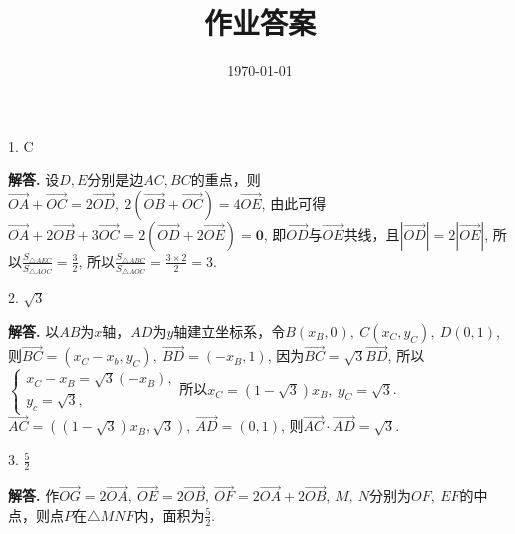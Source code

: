 \documentclass[12pt,a4paper,oneside]{ctexart}
\title{\textbf{作业答案}}
\date{\today}
\newcounter{problemname}
\newenvironment{problem}{\stepcounter{problemname}\par\noindent\textbf{题目\arabic{problemname}. }}{\\\par}
\newenvironment{solution}{\par\noindent\textbf{解答. }}{\\\par}
\newenvironment{note}{\par\noindent\textbf{题目\arabic{problemname}的注记. }}{\\\par}
\begin{document}
\maketitle



1. C
\begin{solution}
    设$ D,E $分别是边$ AC,BC $的重点，则$ \overrightarrow{OA}+\overrightarrow{OC}=2\overrightarrow{OD},\ 2(\overrightarrow{OB}+\overrightarrow{OC})=4\overrightarrow{OE} $, 由此可得$ \overrightarrow{OA}+2\overrightarrow{OB}+3\overrightarrow{OC}=2(\overrightarrow{OD}+2\overrightarrow{OE})=\boldsymbol{0} $, 即$ \overrightarrow{OD} $与$ \overrightarrow{OE} $共线，且$ |\overrightarrow{OD}|=2|\overrightarrow{OE}| $, 所以$ \frac{S_{\triangle AEC}}{S_{\triangle AOC}}=\frac{3}{2} $, 所以$ \frac{S_{\triangle ABC}}{S_{\triangle AOC}}=\frac{3\times 2}{2}=3 $.
\end{solution}

2. $ \sqrt{3} $
\begin{solution}
    以$ AB $为$ x $轴，$ AD $为$ y $轴建立坐标系，令$ B(x_B,0),\ C(x_C,y_C),\ D(0,1) $, 则$ \overrightarrow{BC}=(x_C-x_b,y_C),\ \overrightarrow{BD}=(-x_B,1) $, 因为$ \overrightarrow{BC}=\sqrt{3}\overrightarrow{BD} $, 所以$ \begin{cases}
        x_C-x_B=\sqrt{3}(-x_B),\\
        y_c=\sqrt{3},
    \end{cases} $所以$ x_C=(1-\sqrt{3})x_B,\ y_C=\sqrt{3} $. $ \overrightarrow{AC}=((1-\sqrt{3})x_B, \sqrt{3}),\ \overrightarrow{AD}=(0,1) $, 则$ \overrightarrow{AC}\cdot\overrightarrow{AD}=\sqrt{3} $.
\end{solution}

3. $ \frac{5}{2} $
\begin{solution}
    作$ \overrightarrow{OG}=2\overrightarrow{OA},\ \overrightarrow{OE}=2\overrightarrow{OB},\ \overrightarrow{OF}=2\overrightarrow{OA}+2\overrightarrow{OB} $, $ M,\ N $分别为$ OF,\ EF $的中点，则点$ P $在$ \triangle MNF $内，面积为$ \frac{5}{2} $.
\end{solution}
\end{document}
